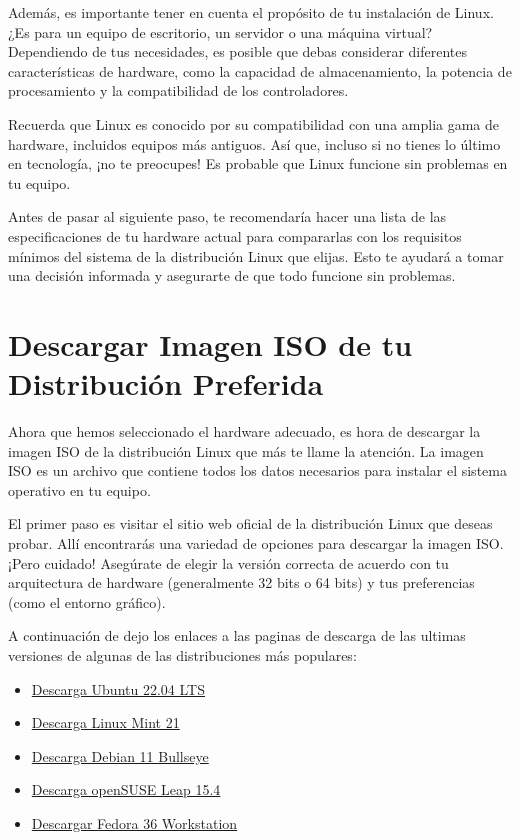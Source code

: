 \documentclass[
  jou,
  floatsintext,
  longtable,
  a4paper,
  nolmodern,
  notxfonts,
  notimes,
  12pt,
  colorlinks=true,linkcolor=blue,citecolor=blue,urlcolor=blue]{apa7}
\begin{document}
Además, es importante tener en cuenta el propósito de tu instalación de
Linux. ¿Es para un equipo de escritorio, un servidor o una máquina
virtual? Dependiendo de tus necesidades, es posible que debas considerar
diferentes características de hardware, como la capacidad de
almacenamiento, la potencia de procesamiento y la compatibilidad de los
controladores.

Recuerda que Linux es conocido por su compatibilidad con una amplia gama
de hardware, incluidos equipos más antiguos. Así que, incluso si no
tienes lo último en tecnología, ¡no te preocupes! Es probable que Linux
funcione sin problemas en tu equipo.

Antes de pasar al siguiente paso, te recomendaría hacer una lista de las
especificaciones de tu hardware actual para compararlas con los
requisitos mínimos del sistema de la distribución Linux que elijas. Esto
te ayudará a tomar una decisión informada y asegurarte de que todo
funcione sin problemas.

\section{Descargar Imagen ISO de tu Distribución
Preferida}\label{descargar-imagen-iso-de-tu-distribuciuxf3n-preferida}

Ahora que hemos seleccionado el hardware adecuado, es hora de descargar
la imagen ISO de la distribución Linux que más te llame la atención. La
imagen ISO es un archivo que contiene todos los datos necesarios para
instalar el sistema operativo en tu equipo.

El primer paso es visitar el sitio web oficial de la distribución Linux
que deseas probar. Allí encontrarás una variedad de opciones para
descargar la imagen ISO. ¡Pero cuidado! Asegúrate de elegir la versión
correcta de acuerdo con tu arquitectura de hardware (generalmente 32
bits o 64 bits) y tus preferencias (como el entorno gráfico).

A continuación de dejo los enlaces a las paginas de descarga de las
ultimas versiones de algunas de las distribuciones más populares:

\begin{itemize}
\item
  \href{https://ubuntu.com/download/desktop}{Descarga Ubuntu 22.04 LTS}
\item
  \href{https://www.linuxmint.com/download.php}{Descarga Linux Mint 21}
\item
  \href{https://www.debian.org/download}{Descarga Debian 11 Bullseye}
\item
  \href{https://get.opensuse.org/leap/15.4/}{Descarga openSUSE Leap
  15.4}
\item
  \href{https://getfedora.org/es/workstation/download/}{Descargar Fedora
  36 Workstation}
\end{itemize}
\end{document}
